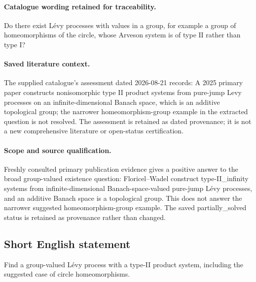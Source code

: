 \documentclass[11pt]{article}
\begin{document}
\paragraph{Catalogue wording retained for traceability.}
Do there exist Lévy processes with values in a group, for example a group of homeomorphisms of the circle, whose Arveson system is of type $\mathrm{II}$ rather than type $\mathrm I$?

\paragraph{Saved literature context.} The supplied catalogue's assessment dated 2026-08-21 records: A 2025 primary paper constructs nonisomorphic type II product systems from pure-jump Levy processes on an infinite-dimensional Banach space, which is an additive topological group; the narrower homeomorphism-group example in the extracted question is not resolved. The assessment is retained as dated provenance; it is not a new comprehensive literature or open-status certification.
\paragraph{Scope and source qualification.}Freshly consulted primary publication evidence gives a positive answer to the broad group-valued existence question: Floricel--Wadel construct type-II_infinity systems from infinite-dimensional Banach-space-valued pure-jump Lévy processes, and an additive Banach space is a topological group. This does not answer the narrower suggested homeomorphism-group example. The saved partially_solved status is retained as provenance rather than changed.
\subsection{Short English statement}
Find a group-valued Lévy process with a type-II product system, including the suggested case of circle homeomorphisms.
\end{document}
